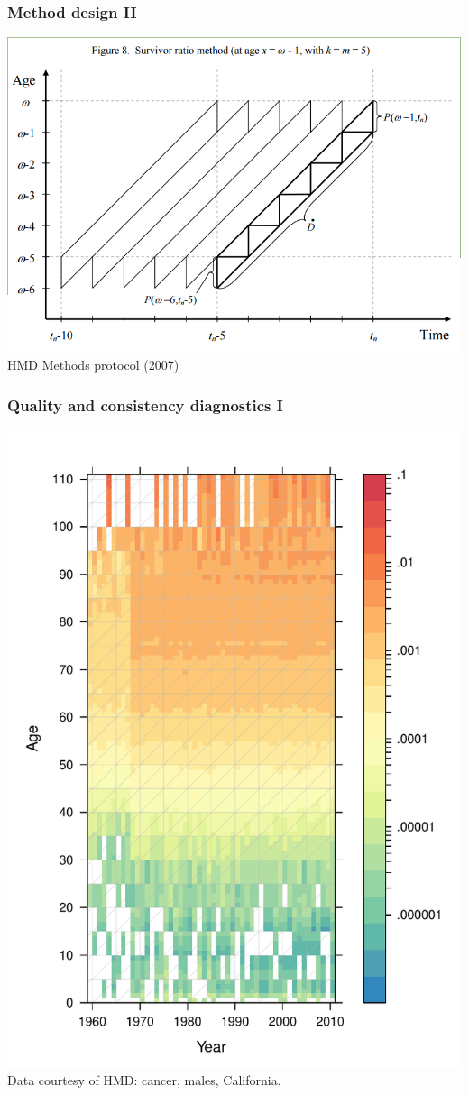 \documentclass[20pt]{beamer}
\begin{document}
\begin{frame}
\frametitle{Method design II}
\includegraphics[scale=.7]{Figures/HMD_MPv5Fig8.png}\\
HMD Methods protocol (2007)
\end{frame}

\begin{frame}
\frametitle{Quality and consistency diagnostics I}
\includegraphics[scale=.8]{Figures/APC_males_CA_cancer.pdf}\\
Data courtesy of HMD: cancer, males, California.
\end{frame}
\end{document}
